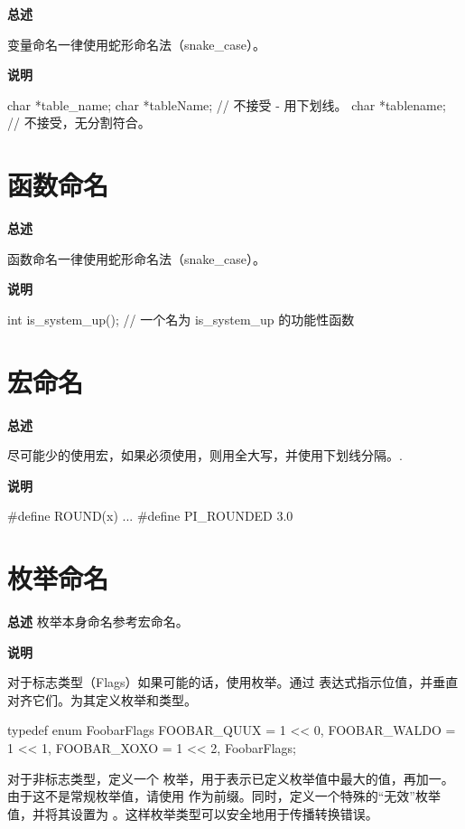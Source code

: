 \textbf{总述}

变量命名一律使用蛇形命名法（snake\_case）。

\textbf{说明}

\begin{ccode}
char *table_name;
char *tableName;   // 不接受 - 用下划线。
char *tablename;   // 不接受，无分割符合。
\end{ccode}

\section{函数命名} \label{c-function-names}

\textbf{总述}

函数命名一律使用蛇形命名法（snake\_case）。

\textbf{说明}

\begin{ccode}
  int is_system_up();  // 一个名为 is_system_up 的功能性函数
\end{ccode}

\section{宏命名} \label{c-macro-names}

\textbf{总述}

尽可能少的使用宏，如果必须使用，则用全大写，并使用下划线分隔。.

\textbf{说明}

\begin{ccode}
#define ROUND(x) ...
#define PI_ROUNDED 3.0
\end{ccode}

\section{枚举命名} \label{c-enum-names}

\textbf{总述}
枚举本身命名参考宏命名。

\textbf{说明}

对于标志类型（Flags）如果可能的话，使用枚举。通过  表达式指示位值，并垂直对齐它们。为其定义枚举和类型。

\begin{ccode}
typedef enum FoobarFlags {
    FOOBAR_QUUX  = 1 << 0,
    FOOBAR_WALDO = 1 << 1,
    FOOBAR_XOXO  = 1 << 2,
} FoobarFlags;
\end{ccode}

对于非标志类型，定义一个  枚举，用于表示已定义枚举值中最大的值，再加一。由于这不是常规枚举值，请使用 \cinline{_} 作为前缀。同时，定义一个特殊的“无效”枚举值，并将其设置为 。这样枚举类型可以安全地用于传播转换错误。

